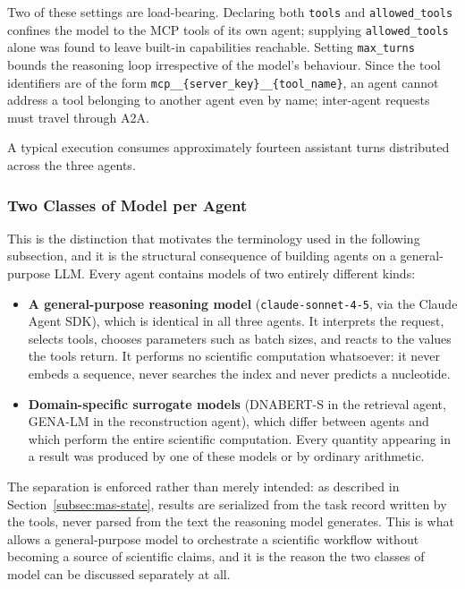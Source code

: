 Two of these settings are load-bearing. Declaring both \texttt{tools} and
\texttt{allowed\_tools} confines the model to the MCP tools of its own agent; supplying
\texttt{allowed\_tools} alone was found to leave built-in capabilities reachable. Setting
\texttt{max\_turns} bounds the reasoning loop irrespective of the model's behaviour. Since
the tool identifiers are of the form
\texttt{mcp\_\_\{server\_key\}\_\_\{tool\_name\}}, an agent cannot address a tool belonging
to another agent even by name; inter-agent requests must travel through A2A.

A typical execution consumes approximately fourteen assistant turns distributed across the
three agents.

\subsubsection{Two Classes of Model per Agent}

This is the distinction that motivates the terminology used in the following subsection,
and it is the structural consequence of building agents on a general-purpose LLM. Every
agent contains models of two entirely different kinds:

\begin{itemize}
    \item \textbf{A general-purpose reasoning model} (\texttt{claude-sonnet-4-5}, via the
    Claude Agent SDK), which is identical in all three agents. It interprets the request,
    selects tools, chooses parameters such as batch sizes, and reacts to the values the
    tools return. It performs no scientific computation whatsoever: it never embeds a
    sequence, never searches the index and never predicts a nucleotide.

    \item \textbf{Domain-specific surrogate models} (DNABERT-S in the retrieval agent,
    GENA-LM in the reconstruction agent), which differ between agents and which perform the
    entire scientific computation. Every quantity appearing in a result was produced by one
    of these models or by ordinary arithmetic.
\end{itemize}

The separation is enforced rather than merely intended: as described in
Section~\ref{subsec:mas-state}, results are serialized from the task record written by the
tools, never parsed from the text the reasoning model generates. This is what allows a
general-purpose model to orchestrate a scientific workflow without becoming a source of
scientific claims, and it is the reason the two classes of model can be discussed
separately at all.

